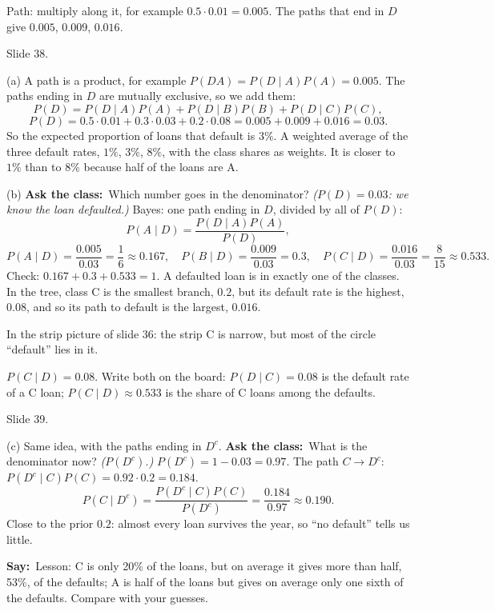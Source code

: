 \documentclass[11pt,a4paper,parskip=half]{scrartcl}
\newcommand{\say}{\textbf{\color{teal}Say:}\ }
\newcommand{\ask}{\textbf{\color{navy}Ask the class:}\ }
\begin{document}
Path: multiply along it, for example $0.5\cdot0.01=0.005$. The paths that
end in $D$ give $0.005$, $0.009$, $0.016$.

\begin{slidecue}
	Slide 38.
\end{slidecue}

(a) A path is a product, for example $P(DA)=P(D\mid A)P(A)=0.005$. The
paths ending in $D$ are mutually exclusive, so we add them:
\[ P(D)=P(D\mid A)P(A)+P(D\mid B)P(B)+P(D\mid C)P(C), \]
\[ P(D)=0.5\cdot0.01+0.3\cdot0.03+0.2\cdot0.08=0.005+0.009+0.016=0.03. \]
So the expected proportion of loans that default is $3\%$. A weighted
average of the three default rates, $1\%$, $3\%$, $8\%$, with
the class shares as weights. It is closer to $1\%$ than to $8\%$ because
half of the loans are A.

(b) \ask Which number goes in the denominator? \emph{($P(D)=0.03$: we know
the loan defaulted.)} Bayes: one path ending in $D$, divided by all of
$P(D)$:
\[ P(A\mid D)=\frac{P(D\mid A)P(A)}{P(D)}, \]
\[ P(A\mid D)=\frac{0.005}{0.03}=\frac16\approx0.167,\quad
	P(B\mid D)=\frac{0.009}{0.03}=0.3,\quad
	P(C\mid D)=\frac{0.016}{0.03}=\frac{8}{15}\approx0.533. \]
Check: $0.167+0.3+0.533=1$. A defaulted loan is in exactly one of the
classes. In the tree, class C is the smallest branch, $0.2$, but its
default rate is the highest, $0.08$, and so its path to default is the
largest, $0.016$.
\begin{printskip}
	In the strip picture of slide 36: the strip C is narrow, but most of the
	circle ``default'' lies in it.
\end{printskip}

\begin{mistake}
	$P(C\mid D)=0.08$. Write both on the board: $P(D\mid C)=0.08$ is the
	default rate of a C loan; $P(C\mid D)\approx0.533$ is the share of C
	loans among the defaults.
\end{mistake}

\begin{slidecue}
	Slide 39.
\end{slidecue}

(c) Same idea, with the paths ending in $D^c$. \ask What is the
denominator now? \emph{($P(D^c)$.)} $P(D^c)=1-0.03=0.97$. The path
$C\to D^c$: $P(D^c\mid C)P(C)=0.92\cdot0.2=0.184$.
\[ P(C\mid D^c)=\frac{P(D^c\mid C)P(C)}{P(D^c)}=\frac{0.184}{0.97}\approx0.190. \]
Close to the prior $0.2$: almost every loan survives the year, so
``no default'' tells us little.

\say Lesson: C is only 20\% of the loans, but on average it gives more
than half, 53\%, of the defaults; A is half of the loans but gives on
average only one sixth of the defaults. Compare with your guesses.
\end{document}
